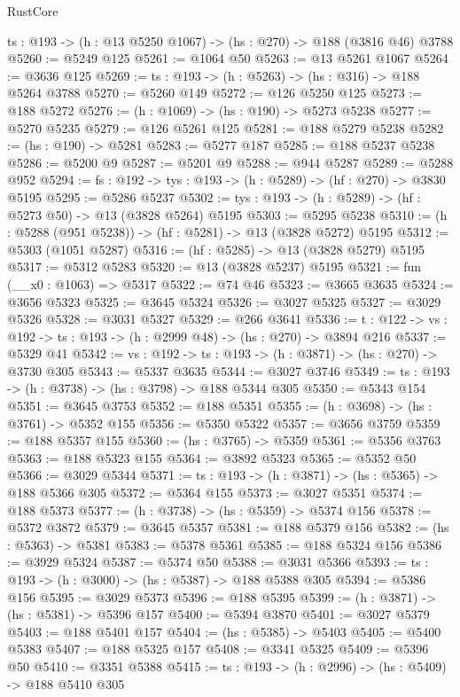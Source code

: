 \begin{lexlean}{RustCore}
\begin{coremodule}
  {ts : @193} -> (h : @13 @5250 @1067) -> (hs : @270) -> @188 (@3816 @46) @3788
@5260 := @5249 @125
@5261 := @1064 @50
@5263 := @13 @5261 @1067
@5264 := @3636 @125
@5269 := {ts : @193} -> (h : @5263) -> (hs : @316) -> @188 @5264 @3788
@5270 := @5260 @149
@5272 := @126 @5250 @125
@5273 := @188 @5272
@5276 := (h : @1069) -> (hs : @190) -> @5273 @5238
@5277 := @5270 @5235
@5279 := @126 @5261 @125
@5281 := @188 @5279 @5238
@5282 := (hs : @190) -> @5281
@5283 := @5277 @187
@5285 := @188 @5237 @5238
@5286 := @5200 @9
@5287 := @5201 @9
@5288 := @944 @5287
@5289 := @5288 @952
@5294 := {fs : @192} -> {tys : @193} -> (h : @5289) -> (hf : @270) -> @3830 @5195
@5295 := @5286 @5237
@5302 := {tys : @193} -> (h : @5289) -> (hf : @5273 @50) -> @13 (@3828 @5264) @5195
@5303 := @5295 @5238
@5310 := (h : @5288 (@951 @5238)) -> (hf : @5281) -> @13 (@3828 @5272) @5195
@5312 := @5303 (@1051 @5287)
@5316 := (hf : @5285) -> @13 (@3828 @5279) @5195
@5317 := @5312 @5283
@5320 := @13 (@3828 @5237) @5195
@5321 := fun (__x0 : @1063) => @5317
@5322 := @74 @46
@5323 := @3665 @3635
@5324 := @3656 @5323
@5325 := @3645 @5324
@5326 := @3027 @5325
@5327 := @3029 @5326
@5328 := @3031 @5327
@5329 := @266 @3641
@5336 := {t : @122} -> {vs : @192} -> {ts : @193} -> (h : @2999 @48) -> (hs : @270) -> @3894 @216
@5337 := @5329 @41
@5342 := {vs : @192} -> {ts : @193} -> (h : @3871) -> (hs : @270) -> @3730 @305
@5343 := @5337 @3635
@5344 := @3027 @3746
@5349 := {ts : @193} -> (h : @3738) -> (hs : @3798) -> @188 @5344 @305
@5350 := @5343 @154
@5351 := @3645 @3753
@5352 := @188 @5351
@5355 := (h : @3698) -> (hs : @3761) -> @5352 @155
@5356 := @5350 @5322
@5357 := @3656 @3759
@5359 := @188 @5357 @155
@5360 := (hs : @3765) -> @5359
@5361 := @5356 @3763
@5363 := @188 @5323 @155
@5364 := @3892 @5323
@5365 := @5352 @50
@5366 := @3029 @5344
@5371 := {ts : @193} -> (h : @3871) -> (hs : @5365) -> @188 @5366 @305
@5372 := @5364 @155
@5373 := @3027 @5351
@5374 := @188 @5373
@5377 := (h : @3738) -> (hs : @5359) -> @5374 @156
@5378 := @5372 @3872
@5379 := @3645 @5357
@5381 := @188 @5379 @156
@5382 := (hs : @5363) -> @5381
@5383 := @5378 @5361
@5385 := @188 @5324 @156
@5386 := @3929 @5324
@5387 := @5374 @50
@5388 := @3031 @5366
@5393 := {ts : @193} -> (h : @3000) -> (hs : @5387) -> @188 @5388 @305
@5394 := @5386 @156
@5395 := @3029 @5373
@5396 := @188 @5395
@5399 := (h : @3871) -> (hs : @5381) -> @5396 @157
@5400 := @5394 @3870
@5401 := @3027 @5379
@5403 := @188 @5401 @157
@5404 := (hs : @5385) -> @5403
@5405 := @5400 @5383
@5407 := @188 @5325 @157
@5408 := @3341 @5325
@5409 := @5396 @50
@5410 := @3351 @5388
@5415 := {ts : @193} -> (h : @2996) -> (hs : @5409) -> @188 @5410 @305

\end{coremodule}
\end{lexlean}
